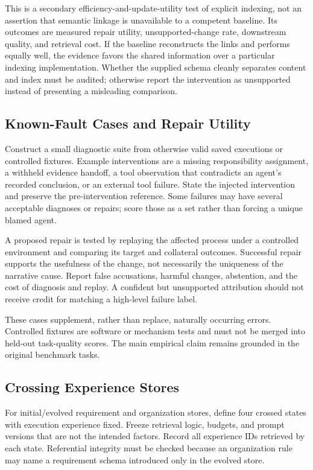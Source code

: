 This is a secondary efficiency-and-update-utility test of explicit indexing, not an assertion that semantic linkage is unavailable to a competent baseline. Its outcomes are measured repair utility, unsupported-change rate, downstream quality, and retrieval cost. If the baseline reconstructs the links and performs equally well, the evidence favors the shared information over a particular indexing implementation. Whether the supplied schema cleanly separates content and index must be audited; otherwise report the intervention as unsupported instead of presenting a misleading comparison.

\subsection{Known-Fault Cases and Repair Utility}

Construct a small diagnostic suite from otherwise valid saved executions or controlled fixtures. Example interventions are a missing responsibility assignment, a withheld evidence handoff, a tool observation that contradicts an agent's recorded conclusion, or an external tool failure. State the injected intervention and preserve the pre-intervention reference. Some failures may have several acceptable diagnoses or repairs; score those as a set rather than forcing a unique blamed agent.

A proposed repair is tested by replaying the affected process under a controlled environment and comparing its target and collateral outcomes. Successful repair supports the usefulness of the change, not necessarily the uniqueness of the narrative cause. Report false accusations, harmful changes, abstention, and the cost of diagnosis and replay. A confident but unsupported attribution should not receive credit for matching a high-level failure label.

These cases supplement, rather than replace, naturally occurring errors. Controlled fixtures are software or mechanism tests and must not be merged into held-out task-quality scores. The main empirical claim remains grounded in the original benchmark tasks.

\subsection{Crossing Experience Stores}
\label{app:cross}

For initial/evolved requirement and organization stores, define four crossed states with execution experience fixed. Freeze retrieval logic, budgets, and prompt versions that are not the intended factors. Record all experience IDs retrieved by each state. Referential integrity must be checked because an organization rule may name a requirement schema introduced only in the evolved store.

